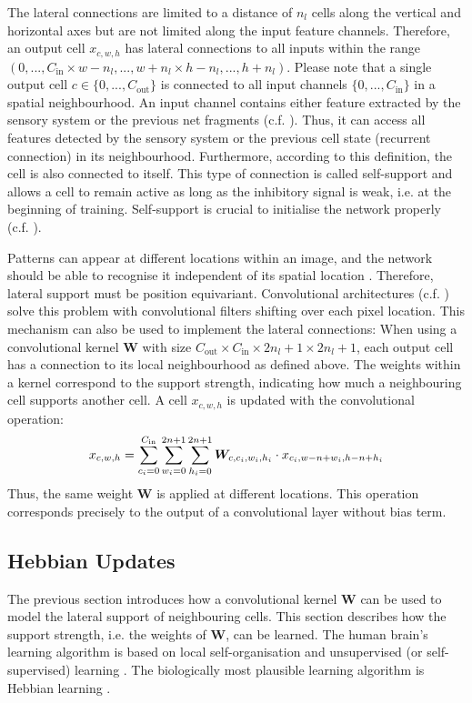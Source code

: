 The lateral connections are limited to a distance of $n_{l}$ cells along the vertical and horizontal axes but are not limited along the input feature channels.
Therefore, an output cell $x_{c,w,h}$ has lateral connections to all inputs within the range $(0, ..., C_{\text{in}} \times w - n_l, ..., w+n_l \times h - n_l, ..., h+n_l)$.
Please note that a single output cell $c \in \{0, ..., C_{\text{out}}\}$ is connected to all input channels $\{0, ..., C_{\text{in}}\}$ in a spatial neighbourhood. An input channel contains either feature extracted by the sensory system or the previous net fragments (c.f. ). Thus, it can access all features detected by the sensory system or the previous cell state (recurrent connection) in its neighbourhood.
Furthermore, according to this definition, the cell is also connected to itself.
This type of connection is called self-support and allows a cell to remain active as long as the inhibitory signal is weak, i.e. at the beginning of training.
Self-support is crucial to initialise the network properly (c.f. ).

Patterns can appear at different locations within an image, and the network should be able to recognise it independent of its spatial location . 
Therefore, lateral support must be position equivariant.
Convolutional architectures (c.f. ) solve this problem with convolutional filters shifting over each pixel location. This mechanism can also be used to implement the lateral connections: When using a convolutional kernel $\boldsymbol{W}$ with size $C_{\text{out}} \times C_{\text{in}} \times 2n_l+1 \times 2n_l+1$, each output cell has a connection to its local neighbourhood as defined above.
The weights within a kernel correspond to the support strength, indicating how much a neighbouring cell supports another cell. A cell $x_{c,w,h}$ is updated with the convolutional operation: 
%
\begin{align}\eqlbl{convlat_1}
	x_{c,w,h} = \sum_{c_i=0}^{C_{\text{in}}} \sum_{w_i=0}^{2n+1} \sum_{h_i=0}^{2n+1} \boldsymbol{W}_{c, c_i,w_i,h_i} \cdot x_{c_i,w-n+w_i,h-n+h_i}
\end{align}
%
Thus, the same weight $\boldsymbol{W}$ is applied at different locations.
This operation corresponds precisely to the output of a convolutional layer without bias term.


\subsection{Hebbian Updates}
The previous section introduces how a convolutional kernel $\boldsymbol{W}$ can be used to model the lateral support of neighbouring cells.
This section describes how the support strength, i.e. the weights of $\boldsymbol{W}$, can be learned.
The human brain's learning algorithm is based on local self-organisation and unsupervised (or self-supervised) learning . The biologically most plausible learning algorithm is Hebbian learning .

